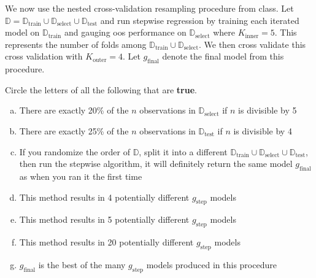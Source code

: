 \documentclass[12pt]{article}
\begin{document}
We now use the nested cross-validation resampling procedure from class. Let $\mathbb{D} = \mathbb{D}_{\text{train}} \cup \mathbb{D}_{\text{select}} \cup \mathbb{D}_{\text{test}}$ and run stepwise regression by training each iterated model on $\mathbb{D}_{\text{train}}$ and gauging oos performance on $\mathbb{D}_{\text{select}}$ where $K_{\text{inner}}=5$. This represents the number of folds among $\mathbb{D}_{\text{train}} \cup \mathbb{D}_{\text{select}}$. We then cross validate this cross validation with $K_{\text{outer}}=4$. Let $g_{\text{final}}$ denote the final model from this procedure.


 Circle the letters of all the following that are \textbf{true}.

\begin{enumerate}[(a)]
\item There are exactly 20\% of the $n$ observations in $\mathbb{D}_{\text{select}}$ if $n$ is divisible by 5
\item There are exactly 25\% of the $n$ observations in $\mathbb{D}_{\text{test}}$ if $n$ is divisible by 4
\item If you randomize the order of $\mathbb{D}$, split it into a different $\mathbb{D}_{\text{train}} \cup \mathbb{D}_{\text{select}} \cup \mathbb{D}_{\text{test}}$, then run the stepwise algorithm, it will definitely return the same model $g_{\text{final}}$ as when you ran it the first time
\item This method results in 4 potentially different $g_\text{step}$ models
\item This method results in 5 potentially different $g_\text{step}$ models
\item This method results in 20 potentially different $g_\text{step}$ models
\item $g_{\text{final}}$ is the best of the many $g_\text{step}$ models produced in this procedure
\end{enumerate}

\eenum
\end{document}
